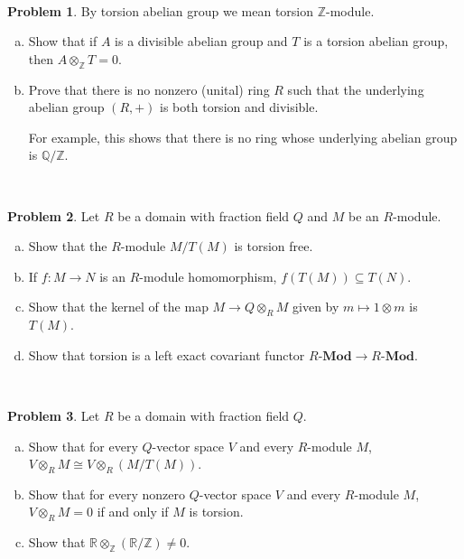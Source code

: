 \documentclass[11pt]{article}
\newcommand{\Q}{\mathbb{Q}}
\newcommand{\Z}{\mathbb{Z}}
\theoremstyle{definition}
\newtheorem{problem}{Problem}
\begin{document}
\vspace{2em}

\noindent
{} 


\



\begin{problem} By torsion abelian group we mean torsion $\Z$-module.
	\begin{enumerate}[a)]
		\item Show that if $A$ is a divisible abelian group and $T$ is a torsion abelian group, then $A \otimes_\Z T = 0$.
		\item Prove that there is no nonzero (unital) ring $R$ such that the underlying abelian group $(R,+)$ is both torsion and divisible. 
		
		\noindent
		For example, this shows that there is no ring whose underlying abelian group is $\Q/\Z$.
	\end{enumerate}
\end{problem}


\


\begin{problem} Let $R$ be a domain with fraction field $Q$ and $M$ be an $R$-module.
	\begin{enumerate}[a)]
		\item Show that the $R$-module $M/T(M)$ is torsion free.
		\item If $f\!: M \longrightarrow N$ is an $R$-module homomorphism, $f(T(M)) \subseteq T(N)$.
		\item Show that the kernel of the map $M \longrightarrow Q \otimes_R M$ given by $m \mapsto 1 \otimes m$ is $T(M)$.		
		\item Show that torsion is a left exact covariant functor $R\textbf{-Mod} \to R\textbf{-Mod}$.
	\end{enumerate}
\end{problem}

\

\begin{problem}
	Let $R$ be a domain with fraction field $Q$.
	\begin{enumerate}[a)]
		\item Show that for every $Q$-vector space $V$ and every $R$-module $M$, $V \otimes_R M \cong V \otimes_R (M/T(M))$.
		\item Show that for every nonzero $Q$-vector space $V$ and every $R$-module $M$, $V \otimes_R M = 0$ if and only if $M$ is torsion.
		\item Show that $\mathbb{R} \otimes_\mathbb{Z} (\mathbb{R} / \mathbb{Z}) \neq 0$.
	\end{enumerate}
\end{problem}
\end{document}
